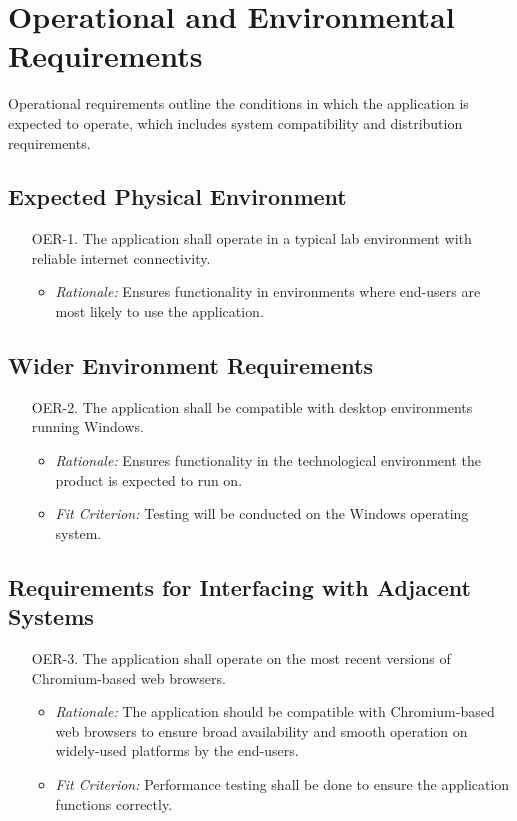 \documentclass[12pt]{article}
\begin{document}
\section{Operational and Environmental Requirements}
Operational requirements outline the conditions in which the application is expected to operate, which includes system compatibility and distribution requirements.
\subsection{Expected Physical Environment}
\begin{enumerate}
  \item[OER-1.] The application shall operate in a typical lab environment with reliable internet connectivity.
    \begin{itemize}
      \item \textit{Rationale:} Ensures functionality in environments where end-users are most likely to use the application. 
    \end{itemize}
\end{enumerate}

\subsection{Wider Environment Requirements}
\begin{enumerate}
  \item[OER-2.] The application shall be compatible with desktop environments running Windows.
    \begin{itemize}
      \item \textit{Rationale:} Ensures functionality in the technological environment the product is expected to run on.
      \item \textit{Fit Criterion:} Testing will be conducted on the Windows operating system.
    \end{itemize}
\end{enumerate}

\subsection{Requirements for Interfacing with Adjacent Systems}
\begin{enumerate}
  \item[OER-3.] The application shall operate on the most recent versions of Chromium-based web browsers.
    \begin{itemize}
      \item \textit{Rationale:} The application should be compatible with Chromium-based web browsers to ensure broad availability and smooth operation on widely-used platforms by the end-users.
      \item \textit{Fit Criterion:} Performance testing shall be done to ensure the application functions correctly.
    \end{itemize}
\end{enumerate}
\end{document}
